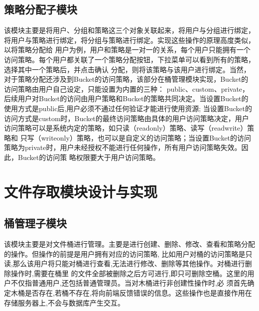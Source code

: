 \subsection{策略分配子模块}

该模块主要是将用户、分组和策略这三个对象关联起来，将用户与分组进行绑定，将用户与策略进行绑定，将分组与策略进行绑定。实现这些操作的原理高度类似，以将策略分配给
用户为例，用户和策略是一对一的关系，每个用户只能拥有一个访问策略。每个用户都关联了一个策略分配按钮，下拉菜单可以看到所有的策略，选择其中一个策略后，并点击确认
分配，则将该策略与该用户进行绑定。当然，对于策略分配还涉及到Bucket的访问策略，该部分在桶管理模块实现，Bucket的访问策略由用户自己设定，只能设置为内置的三种：
public、custom、private，后续用户对Bucket的访问由用户策略和Bucket的策略共同决定。当设置Bucket的使用方式是public后,用户必须不通过任何验证才能进行使用资源;
当设置Bucket的访问方式是custom时，Bucket的最终访问策略由具体的用户访问策略决定，用户访问策略可以是系统内定的策略，如只读（readonly）策略、读写（readwrite）策略和
只写（writeonly）策略，也可以是自定义的访问策略；当设置Bucket的访问策略为private时，用户未经授权不能进行任何操作，所有用户访问策略失效。因此，Bucket的访问策
略权限要大于用户访问策略。

\section{文件存取模块设计与实现}

\subsection{桶管理子模块}

该模块主要是对文件桶进行管理。主要是进行创建、删除、修改、查看和策略分配的操作。但操作的前提是用户拥有对应的访问策略,
比如用户对桶的访问策略是只读,那么该用户将只能对桶进行查看,无法进行修改、删除等其他操作。对桶进行删除操作时,需要在桶里
的文件全部被删除之后方可进行,即只可删除空桶。这里的用户不仅指普通用户,还包括普通管理员。当对木桶进行非创建性操作时,必
须首先确定木桶是否存在,若桶不存在,将向前端反馈错误的信息。这些操作也是直接作用在存储服务器上,不会与数据库产生交互。


